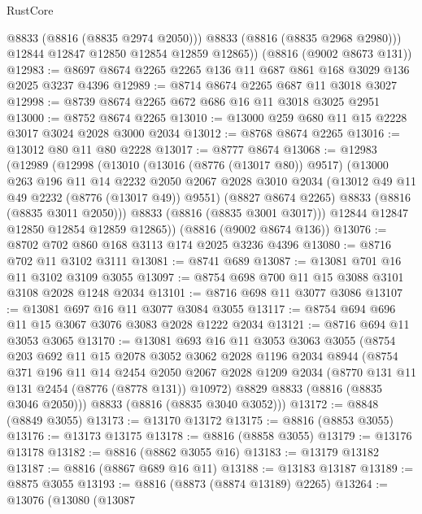 \begin{lexlean}{RustCore}
\begin{coremodule}
            @8833
            (@8816 (@8835 @2974 @2050)))
          @8833
          (@8816 (@8835 @2968 @2980)))
        @12844
        @12847
        @12850
        @12854
        @12859
        @12865))
    (@8816 (@9002 @8673 @131))
@12983 := @8697 @8674 @2265 @2265 @136 @11 @687 @861 @168 @3029 @136 @2025 @3237 @4396
@12989 := @8714 @8674 @2265 @687 @11 @3018 @3027
@12998 := @8739 @8674 @2265 @672 @686 @16 @11 @3018 @3025 @2951
@13000 := @8752 @8674 @2265
@13010 := @13000 @259 @680 @11 @15 @2228 @3017 @3024 @2028 @3000 @2034
@13012 := @8768 @8674 @2265
@13016 := @13012 @80 @11 @80 @2228
@13017 := @8777 @8674
@13068 := @12983
    (@12989
      (@12998
        (@13010
          (@13016 (@8776 (@13017 @80)) @9517)
          (@13000
            @263
            @196
            @11
            @14
            @2232
            @2050
            @2067
            @2028
            @3010
            @2034
            (@13012 @49 @11 @49 @2232 (@8776 (@13017 @49)) @9551)
            (@8827 @8674 @2265)
            @8833
            (@8816 (@8835 @3011 @2050)))
          @8833
          (@8816 (@8835 @3001 @3017)))
        @12844
        @12847
        @12850
        @12854
        @12859
        @12865))
    (@8816 (@9002 @8674 @136))
@13076 := @8702 @702 @860 @168 @3113 @174 @2025 @3236 @4396
@13080 := @8716 @702 @11 @3102 @3111
@13081 := @8741 @689
@13087 := @13081 @701 @16 @11 @3102 @3109 @3055
@13097 := @8754 @698 @700 @11 @15 @3088 @3101 @3108 @2028 @1248 @2034
@13101 := @8716 @698 @11 @3077 @3086
@13107 := @13081 @697 @16 @11 @3077 @3084 @3055
@13117 := @8754 @694 @696 @11 @15 @3067 @3076 @3083 @2028 @1222 @2034
@13121 := @8716 @694 @11 @3053 @3065
@13170 := @13081
    @693
    @16
    @11
    @3053
    @3063
    @3055
    (@8754
      @203
      @692
      @11
      @15
      @2078
      @3052
      @3062
      @2028
      @1196
      @2034
      @8944
      (@8754
        @371
        @196
        @11
        @14
        @2454
        @2050
        @2067
        @2028
        @1209
        @2034
        (@8770 @131 @11 @131 @2454 (@8776 (@8778 @131)) @10972)
        @8829
        @8833
        (@8816 (@8835 @3046 @2050)))
      @8833
      (@8816 (@8835 @3040 @3052)))
@13172 := @8848 (@8849 @3055)
@13173 := @13170 @13172
@13175 := @8816 (@8853 @3055)
@13176 := @13173 @13175
@13178 := @8816 (@8858 @3055)
@13179 := @13176 @13178
@13182 := @8816 (@8862 @3055 @16)
@13183 := @13179 @13182
@13187 := @8816 (@8867 @689 @16 @11)
@13188 := @13183 @13187
@13189 := @8875 @3055
@13193 := @8816 (@8873 (@8874 @13189) @2265)
@13264 := @13076
    (@13080
      (@13087

\end{coremodule}
\end{lexlean}
